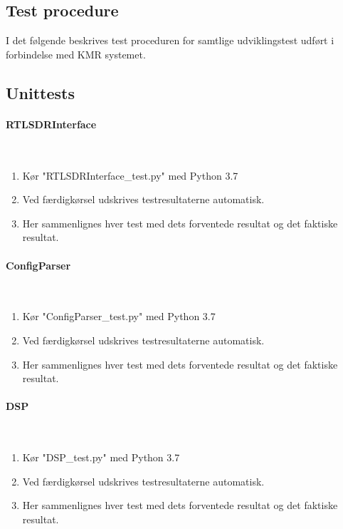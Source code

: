 \begin{appendices}
\pagebreak

\pagebreak
\section{Test procedure}

I det følgende beskrives test proceduren for samtlige udviklingstest udført i forbindelse med KMR systemet. 

\subsection{Unittests}

\paragraph{RTLSDRInterface} \mbox{}\\
\begin{enumerate}
	\item Kør "RTLSDRInterface\_test.py" med Python 3.7
	\item Ved færdigkørsel udskrives testresultaterne automatisk.
	\item Her sammenlignes hver test med dets forventede resultat og det faktiske resultat.
\end{enumerate}

\paragraph{ConfigParser} \mbox{}\\
\begin{enumerate}
	\item Kør "ConfigParser\_test.py" med Python 3.7
	\item Ved færdigkørsel udskrives testresultaterne automatisk.
	\item Her sammenlignes hver test med dets forventede resultat og det faktiske resultat.
\end{enumerate}

\paragraph{DSP} \mbox{}\\
\begin{enumerate}
	\item Kør "DSP\_test.py" med Python 3.7
	\item Ved færdigkørsel udskrives testresultaterne automatisk.
	\item Her sammenlignes hver test med dets forventede resultat og det faktiske resultat.
\end{enumerate}


\end{appendices}
